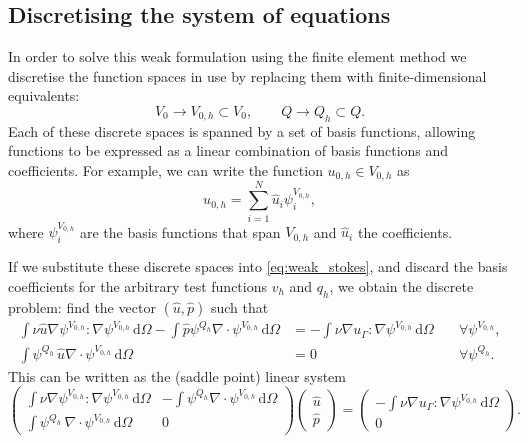 \documentclass[thesis]{subfiles}
\begin{document}
\subsection{Discretising the system of equations}

In order to solve this weak formulation using the finite element method we discretise the function spaces in use by replacing them with finite-dimensional equivalents:
\begin{equation}
  V_0 \to V_{0,h} \subset V_0,
  \quad
  \quad
  Q \to Q_h \subset Q.
\end{equation}
Each of these discrete spaces is spanned by a set of basis functions, allowing functions to be expressed as a linear combination of basis functions and coefficients.
For example, we can write the function $u_{0,h} \in V_{0,h}$ as
\begin{equation}
  u_{0,h} = \sum^N_{i=1} \hat u_i \psi^{V_{0,h}}_i,
\end{equation}
where $\psi^{V_{0,h}}_i$ are the basis functions that span $V_{0,h}$ and $\hat u_i$ the coefficients.

If we substitute these discrete spaces into \cref{eq:weak_stokes}, and discard the basis coefficients for the arbitrary test functions $v_h$ and $q_h$, we obtain the discrete problem: find the vector $(\hat u, \hat p)$ such that
\small
\begin{equation}
  \begin{aligned}
    \int \nu \hat u \nabla \psi^{V_{0,h}} : \nabla \psi^{V_{0,h}} \, \textrm{d}\Omega
    - \int \hat p \psi^{Q_h} \nabla \cdot \psi^{V_{0,h}} \, \textrm{d}\Omega
    &=
    - \int \nu \nabla u_\Gamma : \nabla \psi^{V_{0,h}} \, \textrm{d}\Omega
    \quad
    &\forall \psi^{V_{0,h}}, \\
    \int \psi^{Q_h} \, \hat u \nabla \cdot \psi^{V_{0,h}} \, \textrm{d}\Omega
    &= 0
    \quad
    &\forall \psi^{Q_h}.
  \end{aligned}
\end{equation}
\normalsize
This can be written as the (saddle point) linear system
\small
\begin{equation} \label{eq:stokes_linear_system}
  \left (
  \begin{array}{c|c}
    \int \nu \nabla \psi^{V_{0,h}} : \nabla \psi^{V_{0,h}} \, \textrm{d}\Omega
    &
    - \int \psi^{Q_h} \nabla \cdot \psi^{V_{0,h}} \, \textrm{d}\Omega \\
    \hline
    \int \psi^{Q_h} \, \nabla \cdot \psi^{V_{0,h}} \, \textrm{d}\Omega
    &
    0
  \end{array}
  \right )
  \left (
  \begin{array}{c}
    \hat u \\
    \hline
    \hat p
  \end{array}
  \right )
  =
  \left (
  \begin{array}{c}
    - \int \nu \nabla u_\Gamma : \nabla \psi^{V_{0,h}} \, \textrm{d}\Omega \\
    \hline
    0
  \end{array}
  \right ).
\end{equation}
\normalsize
\end{document}

